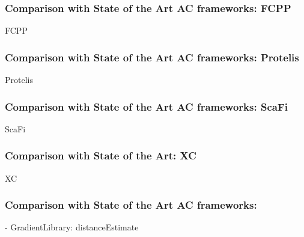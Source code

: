 \begin{frame}
    \frametitle{Comparison with State of the Art \ac{AC} frameworks: FCPP}
    \begin{exampleblock}{FCPP~\cite{fcpp}}
        
    \end{exampleblock}
\end{frame}

\begin{frame}
    \frametitle{Comparison with State of the Art \ac{AC} frameworks: Protelis}
    \begin{exampleblock}{Protelis~\cite{protelis}}
        
    \end{exampleblock}
\end{frame}

\begin{frame}
    \frametitle{Comparison with State of the Art \ac{AC} frameworks: ScaFi}
    \begin{exampleblock}{ScaFi}
        
    \end{exampleblock}
\end{frame}

\begin{frame}
    \frametitle{Comparison with State of the Art: \ac{XC}}
    \begin{exampleblock}{\ac{XC}}
        
    \end{exampleblock}
\end{frame}

\begin{frame}
    \frametitle{Comparison with State of the Art \ac{AC} frameworks: \this}
    \begin{exampleblock}{\this - GradientLibrary: distanceEstimate}
        
    \end{exampleblock}
\end{frame}

